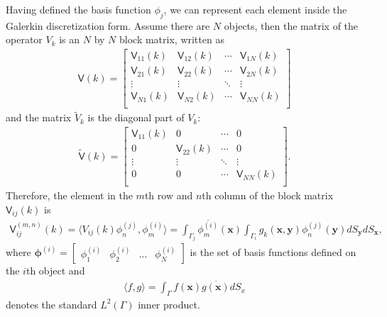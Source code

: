 Having defined the basis function $\phi_j$, we can represent each element inside the Galerkin discretization form. Assume there are $N$ objects,
then the matrix of the operator $V_k$ is an $N$ by $N$ block matrix, written as 
\begin{align}\label{matrix V}
    \mathsf{V}(k) = \begin{bmatrix}
        \mathsf{V}_{11}(k) & \mathsf{V}_{12}(k) & \cdots & \mathsf{V}_{1N}(k) \\
        \mathsf{V}_{21}(k) & \mathsf{V}_{22}(k) & \cdots & \mathsf{V}_{2N}(k) \\
        \vdots & \vdots & \ddots & \vdots \\
        \mathsf{V}_{N1}(k) & \mathsf{V}_{N2}(k) & \cdots & \mathsf{V}_{NN}(k) \\
\end{bmatrix}
\end{align}
and the matrix $\tilde{V}_{k}$ is the diagonal part of $V_{k}$:
\begin{align}\label{matrix tilde V}
    \tilde{\mathsf{V}}(k) = \begin{bmatrix}
        \mathsf{V}_{11}(k) & 0      & \cdots & 0 \\
    0      & \mathsf{V}_{22}(k) & \cdots & 0\\
    \vdots & \vdots & \ddots & \vdots \\
    0      & 0      & \cdots & \mathsf{V}_{NN}(k) \\
\end{bmatrix}.
\end{align}
Therefore, the element in the $m$th row and $n$th column of the block matrix $\mathsf{V}_{ij}(k)$ is 
\begin{align}\label{Elements in matrix V}
    \mathsf{V}_{ij}^{(m,n)} (k) = \langle V_{ij}(k)\phi_{n}^{(j)}, \phi_{m}^{(i)}\rangle = 
    \int_{\Gamma_{j}}\overline{\phi_{m}^{(i)}}(\boldsymbol{x})\int_{\Gamma_{i}}g_{k}(\boldsymbol{x}, \boldsymbol{y})\phi_{n}^{(j)}(\boldsymbol{y})dS_{\boldsymbol{y}}dS_{\boldsymbol{x}},
\end{align}
where $\boldsymbol{\phi}^{(i)} = \begin{bmatrix}
    \phi_{1}^{(i)} & \phi_{2}^{(i)} & \dots & \phi_{N}^{(i)}
\end{bmatrix}$ is the set of basis functions defined on the $i$th object and 
\begin{align*}
    \langle f, g \rangle = \int_{\Gamma}{f(\boldsymbol{x})}\overline{g(\boldsymbol{x})}dS_{x}
\end{align*}
denotes the standard $L^{2}(\Gamma)$ inner product.


